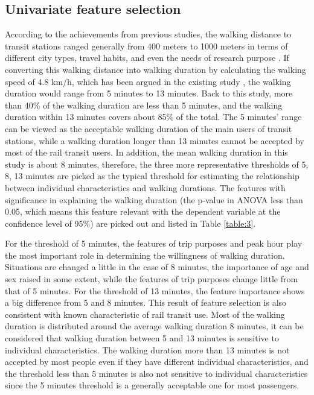 \documentclass[Journal,letterpaper]{ascelike-new}
\begin{document}
%
\subsection{Univariate feature selection}
According to the achievements from previous studies, the walking distance to transit stations ranged generally from 400 meters to 1000 meters in terms of different city types, travel habits, and even the needs of research purpose \cite{Guerra2012,Murray1998,OSullivan1996,Keijer2000,Zhao2003,Alshalalfah2007}. If converting this walking distance into walking duration by calculating the walking speed of 4.8 km/h, which has been argued in the existing study \cite{Bohannon1997}, the walking duration would range from 5 minutes to 13 minutes. Back to this study, more than 40\% of the walking duration are less than 5 minutes, and the walking duration within 13 minutes covers about 85\% of the total. The 5 minutes’ range can be viewed as the acceptable walking duration of the main users of transit stations, while a walking duration longer than 13 minutes cannot be accepted by most of the rail transit users. In addition, the mean walking duration in this study is about 8 minutes, therefore, the three more representative thresholds of 5, 8, 13 minutes are picked as the typical threshold for estimating the relationship between individual characteristics and walking durations. The features with significance in explaining the walking duration (the p-value in ANOVA less than 0.05, which means this feature relevant with the dependent variable at the confidence level of 95\%) are picked out and listed in Table \ref{table:3}.

%
For the threshold of 5 minutes, the features of trip purposes and peak hour play the most important role in determining the willingness of walking duration. Situations are changed a little in the case of 8 minutes, the importance of age and sex raised in some extent, while the features of trip purposes change little from that of 5 minutes. For the threshold of 13 minutes, the feature importance shows a big difference from 5 and 8 minutes. This result of feature selection is also consistent with known characteristic of rail transit use. Most of the walking duration is distributed around the average walking duration 8 minutes, it can be considered that walking duration between 5 and 13 minutes is sensitive to individual characteristics. The walking duration more than 13 minutes is not accepted by most people even if they have different individual characteristics, and the threshold less than 5 minutes is also not sensitive to individual characteristics since the 5 minutes threshold is a generally acceptable one for most passengers.
\end{document}
